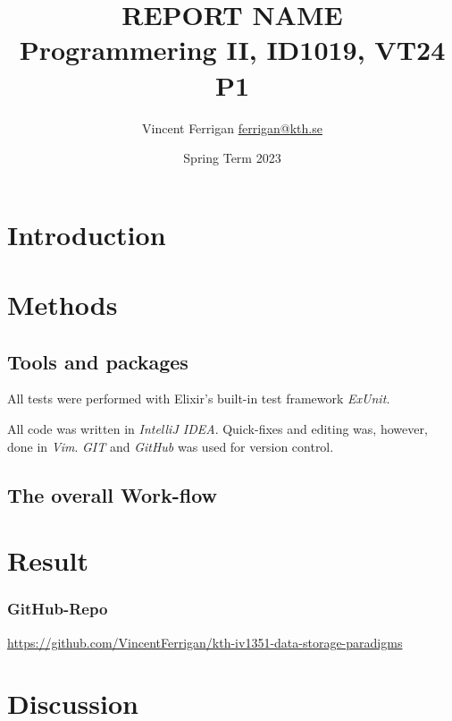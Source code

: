 \documentclass[a4paper,11pt]{article}
\begin{document}
\title{
    REPORT NAME
\\\small{Programmering II, ID1019, VT24 P1}
}
\author{Vincent Ferrigan \href{mailto:ferrigan@kth.se}{ferrigan@kth.se}}

\date{Spring Term 2023}

\maketitle

\section*{Introduction}
\label{sec:introduction}

\section*{Methods}
\label{sec:methods}

\subsection*{Tools and packages}
\label{subsec:tools}
All tests were performed with Elixir's built-in test framework \emph{ExUnit.}

All code was written in \emph{IntelliJ IDEA}.
Quick-fixes and editing was, however, done in \emph{Vim}. 
\emph{GIT} and \emph{GitHub} was used for version control.

\subsection*{The overall Work-flow} %
\label{subsec:workflow}

\section*{Result}
\label{sec:result}

\subsubsection*{GitHub-Repo}
\url{https://github.com/VincentFerrigan/kth-iv1351-data-storage-paradigms}

\section*{Discussion}
\label{sec:discussion}
\end{document}
